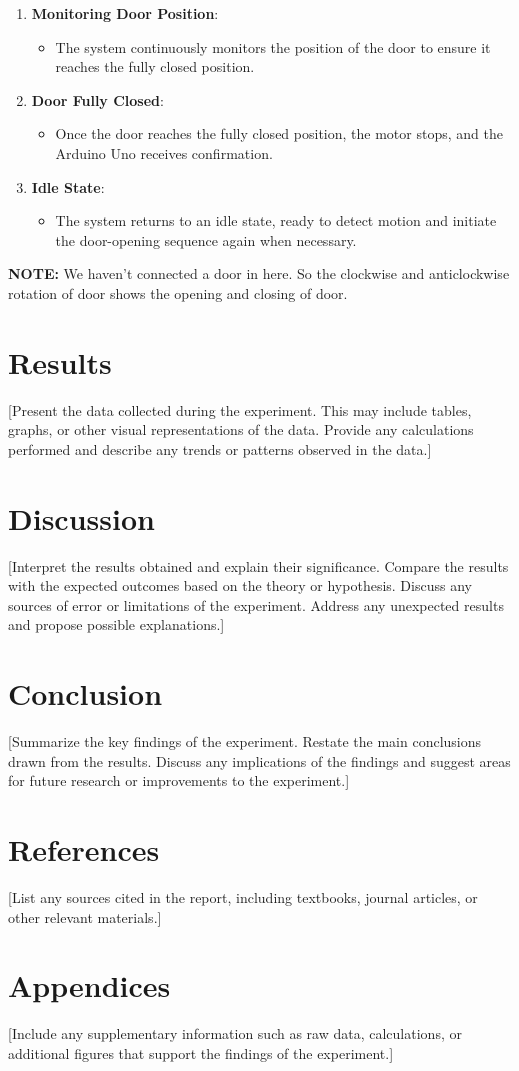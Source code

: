\documentclass{article}
\begin{document}
\begin{enumerate}
    \item \textbf{Monitoring Door Position}:
        \begin{itemize}
            \item The system continuously monitors the position of the door to ensure it reaches the fully closed position.
        \end{itemize}
        
    \item \textbf{Door Fully Closed}:
        \begin{itemize}
            \item Once the door reaches the fully closed position, the motor stops, and the Arduino Uno receives confirmation.
        \end{itemize}
        
    \item \textbf{Idle State}:
        \begin{itemize}
            \item The system returns to an idle state, ready to detect motion and initiate the door-opening sequence again when necessary.
        \end{itemize}
\end{enumerate}

\textbf{NOTE:} We haven't connected a door in here. So the clockwise and anticlockwise rotation of door shows the opening and closing of door. 





\section{Results}
[Present the data collected during the experiment. This may include tables, graphs, or other visual representations of the data. Provide any calculations performed and describe any trends or patterns observed in the data.]

\section{Discussion}
[Interpret the results obtained and explain their significance. Compare the results with the expected outcomes based on the theory or hypothesis. Discuss any sources of error or limitations of the experiment. Address any unexpected results and propose possible explanations.]

\section{Conclusion}
[Summarize the key findings of the experiment. Restate the main conclusions drawn from the results. Discuss any implications of the findings and suggest areas for future research or improvements to the experiment.]

\section*{References}
[List any sources cited in the report, including textbooks, journal articles, or other relevant materials.]

\section*{Appendices}
[Include any supplementary information such as raw data, calculations, or additional figures that support the findings of the experiment.]
\end{document}

